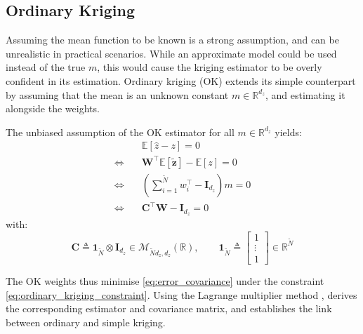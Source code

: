 \subsection{Ordinary Kriging}

Assuming the mean function to be known is a strong assumption, and can be unrealistic in practical scenarios. While an approximate model could be used instead of the true $m$, this would cause the kriging estimator to be overly confident in its estimation. Ordinary kriging (OK) extends its simple counterpart by assuming that the mean is an unknown constant $m\in\mathbb{R}^{d_z}$, and estimating it alongside the weights.

The unbiased assumption of the OK estimator for all $m\in\mathbb{R}^{d_z}$ yields:
\begin{equation}
	\begin{aligned}
	&\mathbb{E}[\hat{z}-z]=0\\
	\iff\quad&\mathbf{W}^\top\mathbb{E}[\tilde{\mathbf{z}}]-\mathbb{E}[z]=0\\
	\iff\quad&\left(\sum_{i=1}^{\tilde{N}}w_i^\top-\mathbf{I}_{d_z}\right)m=0\\
	\iff\quad&\mathbf{C}^\top \mathbf{W}-\mathbf{I}_{d_z}=0
	\end{aligned}\label{eq:ordinary_kriging_constraint}
\end{equation}
with:
\begin{equation}
	\mathbf{C}\triangleq\mathbf{1}_{\tilde{N}}\otimes \mathbf{I}_{d_z}\in\mathcal{M}_{\tilde{N}d_z,d_z}(\mathbb{R}),\qquad\mathbf{1}_{\tilde{N}}\triangleq\begin{bmatrix}1\\\vdots\\1\end{bmatrix}\in\mathbb{R}^{\tilde{N}}\label{eq:C_definition}
\end{equation}

The OK weights thus minimise \eqref{eq:error_covariance} under the constraint \eqref{eq:ordinary_kriging_constraint}. Using the Lagrange multiplier method \cite{bib:Lagrange-multipliers},  derives the corresponding estimator and covariance matrix, and  establishes the link between ordinary and simple kriging.

